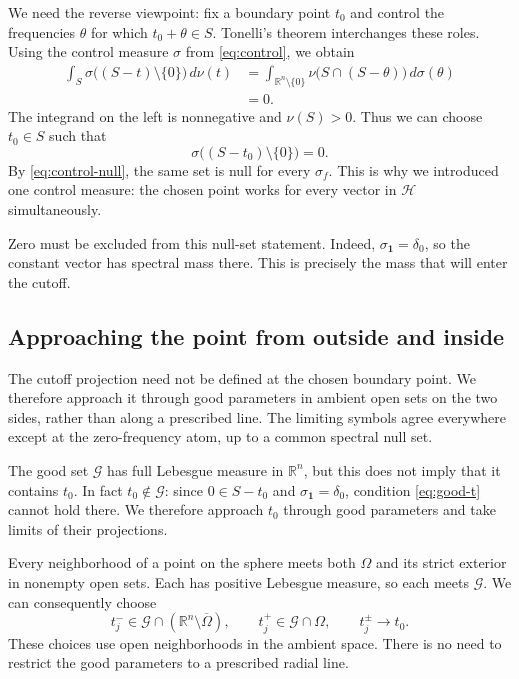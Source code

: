 \documentclass[a4paper,12pt,reqno]{amsart}
\newcommand{\lead}[1]{\par\smallskip\noindent\leavevmode#1\par\smallskip}
\theoremstyle{remark}
\numberwithin{equation}{section}
\newcommand{\R}{\mathbb R}
\newcommand{\Hh}{\mathcal H}
\newcommand{\one}{\mathbf 1}
\begin{document}
We need the reverse viewpoint: fix a boundary point $t_0$ and control
the frequencies $\theta$ for which $t_0+\theta\in S$.
Tonelli's theorem interchanges these roles. Using the control measure $\sigma$
from \eqref{eq:control}, we obtain
\begin{equation}\label{eq:boundary-fubini}
 \begin{aligned}
 \int_{S}\sigma\bigl((S-t)\setminus\{0\}\bigr)\,d\nu(t)
 &=\int_{\R^n\setminus\{0\}}
     \nu\bigl(S\cap(S-\theta)\bigr)\,d\sigma(\theta)\\
 &=0.
 \end{aligned}
\end{equation}
The integrand on the left is nonnegative and $\nu(S)>0$.  Thus we can
choose $t_0\in S$ such that
\begin{equation}\label{eq:boundary-null}
 \sigma\bigl((S-t_0)\setminus\{0\}\bigr)=0.
\end{equation}
By \eqref{eq:control-null}, the same set is null for every $\sigma_f$.
This is why we introduced one control measure: the chosen point works
for every vector in $\Hh$ simultaneously.

Zero must be excluded from this null-set statement.  Indeed,
$\sigma_{\one}=\delta_0$, so the constant vector has spectral mass
there.  This is precisely the mass that will enter the cutoff.

\subsection{Approaching the point from outside and inside}

\lead{The cutoff projection need not be defined at the chosen boundary
point. We therefore approach it through good parameters in ambient open
sets on the two sides, rather than along a prescribed line. The limiting
symbols agree everywhere except at the zero-frequency atom, up to a common
spectral null set.}


The good set $\mathcal G$ has full Lebesgue measure in $\R^n$, but this
does not imply that it contains $t_0$.  In fact $t_0\notin\mathcal G$:
since $0\in S-t_0$ and $\sigma_{\one}=\delta_0$, condition
\eqref{eq:good-t} cannot hold there.  We therefore approach $t_0$
through good parameters and take limits of their projections.

Every neighborhood of a point on the sphere meets both $\Omega$ and
its strict exterior in nonempty open sets.  Each has positive Lebesgue
measure, so each meets $\mathcal G$.  We can consequently choose
\[
 t_j^-\in\mathcal G\cap(\R^n\setminus\overline\Omega),\qquad
 t_j^+\in\mathcal G\cap\Omega,\qquad t_j^\pm\longrightarrow t_0.
\]
These choices use open neighborhoods in the ambient space.  There is
no need to restrict the good parameters to a prescribed radial line.
\end{document}
